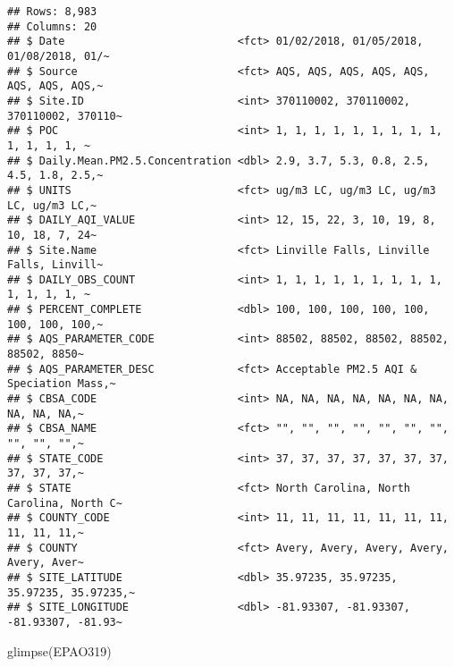 \documentclass[
]{article}
\newenvironment{Shaded}{\begin{snugshade}}{\end{snugshade}}
\newcommand{\FunctionTok}[1]{\textcolor[rgb]{0.00,0.00,0.00}{#1}}
\newcommand{\NormalTok}[1]{#1}
\begin{document}
\begin{verbatim}
## Rows: 8,983
## Columns: 20
## $ Date                           <fct> 01/02/2018, 01/05/2018, 01/08/2018, 01/~
## $ Source                         <fct> AQS, AQS, AQS, AQS, AQS, AQS, AQS, AQS,~
## $ Site.ID                        <int> 370110002, 370110002, 370110002, 370110~
## $ POC                            <int> 1, 1, 1, 1, 1, 1, 1, 1, 1, 1, 1, 1, 1, ~
## $ Daily.Mean.PM2.5.Concentration <dbl> 2.9, 3.7, 5.3, 0.8, 2.5, 4.5, 1.8, 2.5,~
## $ UNITS                          <fct> ug/m3 LC, ug/m3 LC, ug/m3 LC, ug/m3 LC,~
## $ DAILY_AQI_VALUE                <int> 12, 15, 22, 3, 10, 19, 8, 10, 18, 7, 24~
## $ Site.Name                      <fct> Linville Falls, Linville Falls, Linvill~
## $ DAILY_OBS_COUNT                <int> 1, 1, 1, 1, 1, 1, 1, 1, 1, 1, 1, 1, 1, ~
## $ PERCENT_COMPLETE               <dbl> 100, 100, 100, 100, 100, 100, 100, 100,~
## $ AQS_PARAMETER_CODE             <int> 88502, 88502, 88502, 88502, 88502, 8850~
## $ AQS_PARAMETER_DESC             <fct> Acceptable PM2.5 AQI & Speciation Mass,~
## $ CBSA_CODE                      <int> NA, NA, NA, NA, NA, NA, NA, NA, NA, NA,~
## $ CBSA_NAME                      <fct> "", "", "", "", "", "", "", "", "", "",~
## $ STATE_CODE                     <int> 37, 37, 37, 37, 37, 37, 37, 37, 37, 37,~
## $ STATE                          <fct> North Carolina, North Carolina, North C~
## $ COUNTY_CODE                    <int> 11, 11, 11, 11, 11, 11, 11, 11, 11, 11,~
## $ COUNTY                         <fct> Avery, Avery, Avery, Avery, Avery, Aver~
## $ SITE_LATITUDE                  <dbl> 35.97235, 35.97235, 35.97235, 35.97235,~
## $ SITE_LONGITUDE                 <dbl> -81.93307, -81.93307, -81.93307, -81.93~
\end{verbatim}

\begin{Shaded}
\begin{Highlighting}[]
\FunctionTok{glimpse}\NormalTok{(EPAO319)}
\end{Highlighting}
\end{Shaded}
\end{document}
